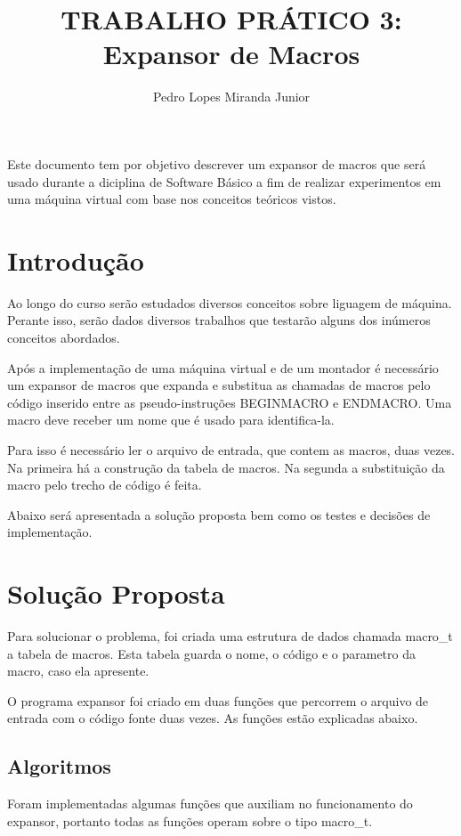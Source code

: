 \documentclass[12pt]{article}
\title{TRABALHO PRÁTICO 3: \\ Expansor de Macros}
\author{Pedro Lopes Miranda Junior}
\begin{document}
\maketitle

\begin{resumo}
 Este documento tem por objetivo descrever um expansor de
 macros que será usado durante a diciplina de Software Básico a fim de realizar
 experimentos em uma máquina virtual com base nos conceitos teóricos vistos.
\end{resumo}

\section{Introdução}
\label{introducao}
Ao longo do curso serão estudados diversos conceitos sobre liguagem de máquina.
Perante isso, serão dados diversos trabalhos que testarão alguns dos inúmeros
conceitos abordados.

Após a implementação de uma máquina virtual e de um montador é necessário um
expansor de macros que expanda e substitua as chamadas de macros pelo código
inserido entre as pseudo-instruções BEGINMACRO e ENDMACRO. Uma macro deve
receber um nome que é usado para identifica-la.

Para isso é necessário ler o arquivo de entrada, que contem as macros, duas
vezes. Na primeira há a construção da tabela de macros. Na segunda a
substituição da macro pelo trecho de código é feita.

Abaixo será apresentada a solução proposta bem como os testes e decisões de
implementação.

\section{Solução Proposta}
\label{solucao_proposta}

Para solucionar o problema, foi criada uma estrutura de dados chamada
macro\_t a tabela de macros.
Esta tabela guarda o nome, o código e o parametro da macro, caso ela apresente.

O programa expansor foi criado em duas funções que percorrem o arquivo de
entrada com o código fonte duas vezes. As funções estão explicadas abaixo.
\subsection{Algoritmos}

Foram implementadas algumas funções que auxiliam no funcionamento do expansor, 
portanto todas as funções operam sobre o tipo macro\_t.
\newpage
\end{document}

